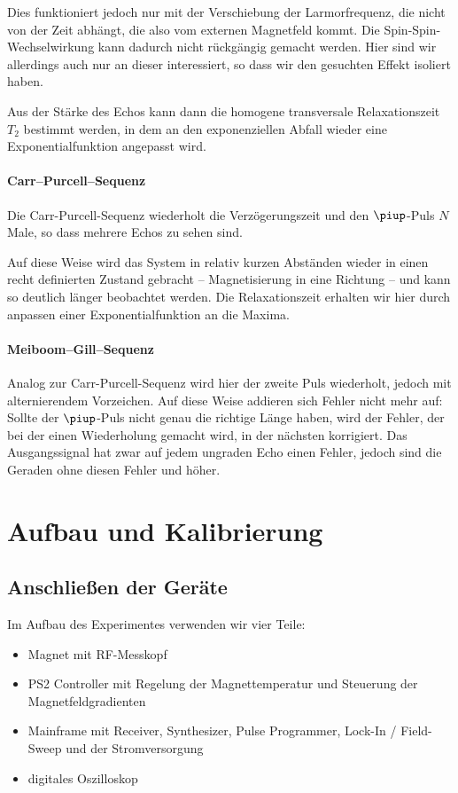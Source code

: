 Dies funktioniert jedoch nur mit der Verschiebung der Larmorfrequenz, die nicht
von der Zeit abhängt, die also vom externen Magnetfeld kommt. Die
Spin-Spin-Wechselwirkung kann dadurch nicht rückgängig gemacht werden. Hier
sind wir allerdings auch nur an dieser interessiert, so dass wir den gesuchten
Effekt isoliert haben.

Aus der Stärke des Echos kann dann die homogene transversale Relaxationszeit
$T_2$ bestimmt werden, in dem an den exponenziellen Abfall wieder eine
Exponentialfunktion angepasst wird.

\subsubsection{Carr–Purcell–Sequenz}

Die Carr-Purcell-Sequenz wiederholt die Verzögerungszeit und den $\piup$-Puls
$N$ Male, so dass mehrere Echos zu sehen sind.

Auf diese Weise wird das System in relativ kurzen Abständen wieder in einen
recht definierten Zustand gebracht – Magnetisierung in eine Richtung – und kann
so deutlich länger beobachtet werden. Die Relaxationszeit erhalten wir hier
durch anpassen einer Exponentialfunktion an die Maxima.

\subsubsection{Meiboom–Gill–Sequenz}

Analog zur Carr-Purcell-Sequenz wird hier der zweite Puls wiederholt, jedoch
mit alternierendem Vorzeichen. Auf diese Weise addieren sich Fehler nicht mehr
auf: Sollte der $\piup$-Puls nicht genau die richtige Länge haben, wird der
Fehler, der bei der einen Wiederholung gemacht wird, in der nächsten
korrigiert. Das Ausgangssignal hat zwar auf jedem ungraden Echo einen Fehler,
jedoch sind die Geraden ohne diesen Fehler und höher.

\chapter{Aufbau und Kalibrierung}
\section{Anschließen der Geräte}

Im Aufbau des Experimentes verwenden wir vier Teile:

\begin{itemize}
    \item
        Magnet mit RF-Messkopf
    \item
        PS2 Controller mit Regelung der Magnettemperatur und Steuerung der
        Magnetfeldgradienten
    \item
        Mainframe mit Receiver, Synthesizer, Pulse Programmer, Lock-In /
        Field-Sweep und der Stromversorgung
    \item
        digitales Oszilloskop
\end{itemize}

